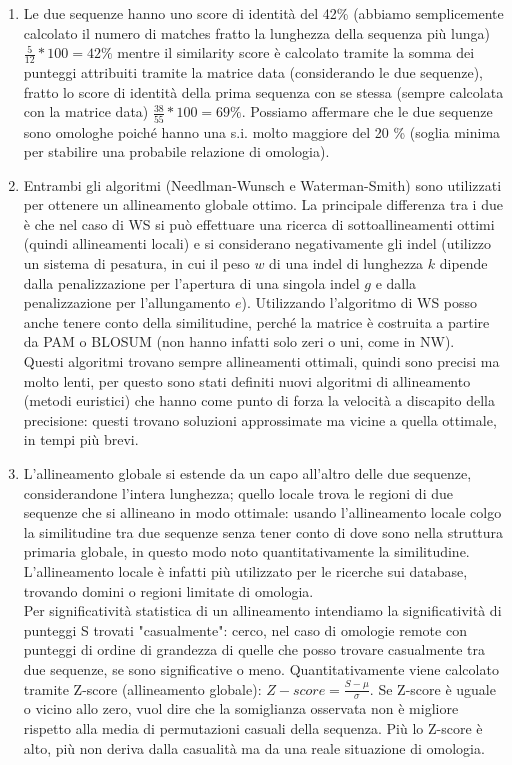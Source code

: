 \documentclass{article}
\begin{document}
\begin{enumerate}[1)]
   \item Le due sequenze hanno uno score di identità del 42\% (abbiamo semplicemente calcolato il numero di matches fratto la lunghezza della sequenza più lunga) $\frac{5}{12}* 100= 42 \%$ mentre il similarity score è calcolato tramite la somma dei punteggi attribuiti tramite la matrice data (considerando le due sequenze), fratto lo score di identità della prima sequenza con se stessa (sempre calcolata con la matrice data) $\frac{38}{55}*100 = 69 \%$. Possiamo affermare che le due sequenze sono omologhe poiché hanno una s.i. molto maggiore del 20 \% (soglia minima per stabilire una probabile relazione di omologia).
   \item Entrambi gli algoritmi (Needlman-Wunsch e Waterman-Smith) sono utilizzati per ottenere un allineamento globale ottimo. La principale differenza tra i due è che nel caso di WS si può effettuare una ricerca di sottoallineamenti ottimi (quindi allineamenti locali) e si considerano negativamente gli indel (utilizzo un sistema di pesatura, in cui il peso $w$ di una indel di lunghezza $k$ dipende dalla penalizzazione per l'apertura di una singola indel $g$ e dalla penalizzazione per l'allungamento $e$). Utilizzando l'algoritmo di WS posso anche tenere conto della similitudine, perché la matrice è costruita a partire da PAM o BLOSUM (non hanno infatti solo zeri o uni, come in NW).\\
   Questi algoritmi trovano sempre allineamenti ottimali, quindi sono precisi ma molto lenti, per questo sono stati definiti nuovi algoritmi di allineamento (metodi euristici) che hanno come punto di forza la velocità a discapito della precisione: questi trovano soluzioni approssimate ma vicine a quella ottimale, in tempi più brevi. 
   \item L'allineamento globale si estende da un capo all'altro delle due sequenze, considerandone l'intera lunghezza; quello locale trova le regioni di due sequenze che si allineano in modo ottimale: usando l'allineamento locale colgo la similitudine tra due sequenze senza tener conto di dove sono nella struttura primaria globale, in questo modo noto quantitativamente la similitudine. L'allineamento locale è infatti più utilizzato per le ricerche sui database, trovando domini o regioni limitate di omologia.\\
   Per significatività statistica di un allineamento intendiamo la significatività di punteggi S trovati "casualmente": cerco, nel caso di omologie remote con punteggi di ordine di grandezza di quelle che posso trovare casualmente tra due sequenze, se sono significative o meno. Quantitativamente viene calcolato tramite Z-score (allineamento globale): $Z-score = \frac{S - \mu}{\sigma}$. Se Z-score è uguale o vicino allo zero, vuol dire che la somiglianza osservata non è migliore rispetto alla media di permutazioni casuali della sequenza. Più lo Z-score è alto, più non deriva dalla casualità ma da una reale situazione di omologia.

\end{enumerate}
\end{document}
